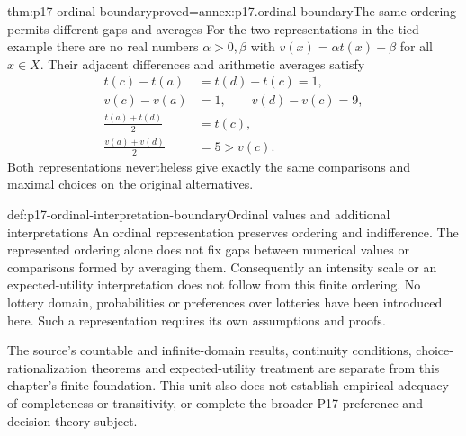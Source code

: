 \begin{hbtheorem}{thm:p17-ordinal-boundary}{proved=annex:p17.ordinal-boundary}{The same ordering permits different gaps and averages}
For the two representations in the tied example there are no real numbers
\(\alpha>0,\beta\) with \(v(x)=\alpha t(x)+\beta\) for all
\(x\in X\). Their adjacent differences and arithmetic averages satisfy
\[
\begin{aligned}
 t(c)-t(a)&=t(d)-t(c)=1,\\
 v(c)-v(a)&=1,\qquad v(d)-v(c)=9,\\
 \frac{t(a)+t(d)}2&=t(c),\\
 \frac{v(a)+v(d)}2&=5>v(c).
\end{aligned}
\]
Both representations nevertheless give exactly the same comparisons and
maximal choices on the original alternatives.
\end{hbtheorem}

\begin{hbwarning}{def:p17-ordinal-interpretation-boundary}{Ordinal values and additional interpretations}
An ordinal representation preserves ordering and indifference. The represented
ordering alone does not fix gaps between numerical values or comparisons
formed by averaging them. Consequently an intensity scale or an
expected-utility interpretation does not follow from this finite ordering.
No lottery domain, probabilities or preferences over lotteries have been
introduced here. Such a representation requires its own assumptions and
proofs.

The source's countable and infinite-domain results, continuity conditions,
choice-rationalization theorems and expected-utility treatment are separate
from this chapter's finite foundation. This unit also does not establish
empirical adequacy of completeness or transitivity, or complete the broader
P17 preference and decision-theory subject.
\end{hbwarning}
